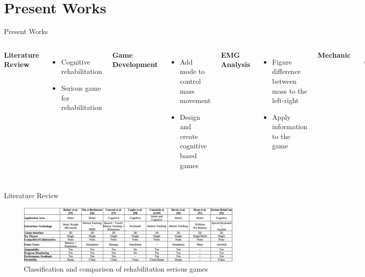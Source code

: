 \documentclass[10pt]{beamer}
\begin{document}
\section{Present Works}
	\begin{frame}{Present Works}
	\begin{columns}[t]
			\large \textbf{Literature Review}
			\normalsize
			\begin{itemize}
				\item Cognitive rehabilitation
				\item Serious game for rehabilitation \newline\newline 
			\end{itemize}

			\large \textbf {Game Development}
			\normalsize
			\begin{itemize}
				\item Add mode to control mass movement
				\item Design and create cognitive based games
			\end{itemize}
			\large \textbf{EMG Analysis}
			\normalsize
			\begin{itemize}
				\item Figure difference between mass to the left-right
				\item Apply information to the game \newline
			\end{itemize}
			\large \textbf{Mechanic}
			\normalsize
			\begin{itemize}
				\item Sent device back to fix problems
			\end{itemize}
	\end{columns}		
	\end{frame}
	
	\begin{frame}{Literature Review}
		\begin{figure}[h]
			\includegraphics[width=\textwidth]{serious_game_table.png}
			\caption{Classification and comparison of rehabilitation serious games}
		\end{figure}
	\end{frame}
	
\end{document}

